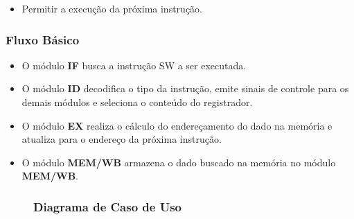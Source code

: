\postconditions
\begin{itemize}
	\item Permitir a execução da próxima instrução.
\end{itemize}

\subsubsection*{Fluxo Básico}
\begin{itemize}
	\item O módulo \textbf{IF} busca a instrução SW a ser executada.
	\item O módulo \textbf{ID} decodifica o tipo da instrução, emite sinais de controle para os demais módulos e seleciona o conteúdo do registrador.
	\item O módulo \textbf{EX} realiza o cálculo do endereçamento do dado na memória e atualiza para o endereço da próxima instrução.
	
	\item O módulo \textbf{MEM/WB} armazena o dado buscado na memória no módulo \textbf{MEM/WB}.
\end{itemize}

\begin{figure}[H]
	\subsubsection*{Diagrama de Caso de Uso}
		
\end{figure}
